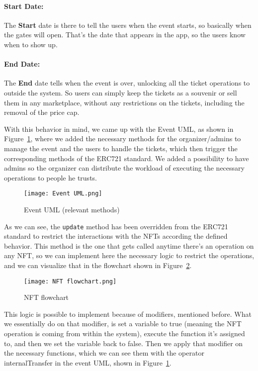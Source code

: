 \paragraph{Start Date:} The \textbf{Start} date is there to tell the users when the event starts, so
basically when the gates will open. That's the date that appears in the app, so
the users know when to show up.

\paragraph{End Date:} The \textbf{End} date tells when the event is over, unlocking all the ticket
operations to outside the system. So users can simply keep the tickets as a
souvenir or sell them in any marketplace, without any restrictions on the
tickets, including the removal of the price cap.

With this behavior in mind, we came up with the Event UML, as shown in
Figure~\ref{fig:event_uml}, where we added the necessary methods for the
organizer/admins to manage the event and the users to handle the tickets, which
then trigger the corresponding methods of the ERC721 standard. We added a
possibility to have admins so the organizer can distribute the workload of
executing the necessary operations to people he trusts.

\begin{figure}[H]
	\texttt{[image: Event UML.png]}
	\centering
	\caption{Event UML (relevant methods)}\label{fig:event_uml}
\end{figure}

As we can see, the \texttt{update} method has been overridden from the ERC721
standard to restrict the interactions with the NFTs according the defined
behavior. This method is the one that gets called anytime there's an operation
on any NFT, so we can implement here the necessary logic to restrict the
operations, and we can visualize that in the flowchart shown in
Figure~\ref{fig:nft_flowchart}.

\begin{figure}[H]
	\texttt{[image: NFT flowchart.png]}
	\centering
	\caption{NFT flowchart}\label{fig:nft_flowchart}
\end{figure}

This logic is possible to implement because of modifiers, mentioned before.
What we essentially do on that modifier, is set a variable to true (meaning the
NFT operation is coming from within the system), execute the function it's
assigned to, and then we set the variable back to false. Then we apply that
modifier on the necessary functions, which we can see them with the operator
	{internalTransfer} in the event UML, shown in Figure~\ref{fig:event_uml}.

